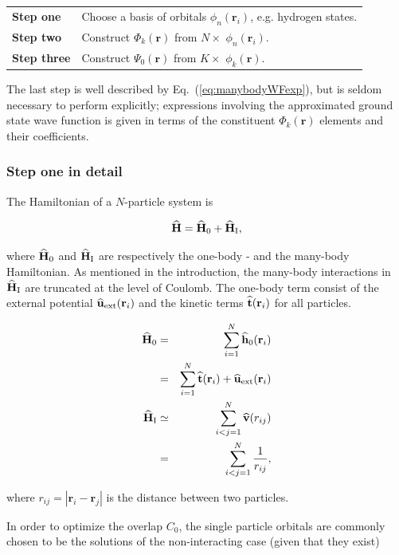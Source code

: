 \begin{center}
\begin{tabular}{l|l}
 \textbf{Step one}   &  Choose a basis of orbitals $\phi_n(\mathbf{r}_i)$, e.g. hydrogen states. \\
 \textbf{Step two}   &  Construct $\Phi_k(\mathbf{r})$ from $N\times$ $\phi_n(\mathbf{r}_i)$.   \\
 \textbf{Step three} &  Construct $\Psi_0(\mathbf{r})$ from $K\times$ $\phi_k(\mathbf{r})$.     \\
\end{tabular}
\end{center}

The last step is well described by Eq.~(\ref{eq:manybodyWFexp}), but is seldom necessary to perform explicitly; expressions involving the approximated ground state wave function is given in terms of the constituent $\Phi_k(\mathbf{r})$ elements and their coefficients.

\subsubsection{Step one in detail}

The Hamiltonian of a $N$-particle system is 

\begin{equation}
 {\bf\widehat{H}} = {\bf\widehat{H}}_0 + {\bf\widehat{H}}_\mathrm{I},
\end{equation}

where ${\bf\widehat{H}}_0$ and ${\bf\widehat{H}}_\mathrm{I}$ are respectively the one-body - and the many-body Hamiltonian. As mentioned in the introduction, the many-body interactions in ${\bf\widehat{H}}_\mathrm{I}$ are truncated at the level of Coulomb. The one-body term consist of the external potential ${\bf\widehat{u}}_\mathrm{ext}(\mathbf{r}_i)$ and the kinetic terms ${\bf\widehat{t}}(\mathbf{r}_i)$ for all particles.

\begin{eqnarray}
 {\bf\widehat{H}}_0 &=& \sum_{i=1}^N {\bf\widehat{h}}_0(\mathbf{r}_i) \\
          &=& \sum_{i=1}^N {\bf\widehat{t}}(\mathbf{r}_i) + {\bf\widehat{u}}_\mathrm{ext}(\mathbf{r}_i) \nonumber\\
 {\bf\widehat{H}}_\mathrm{I} &\simeq& \sum_{i<j=1}^N {\bf\widehat{v}}(r_{ij}) \\
          &=& \sum_{i<j=1}^N \frac{1}{r_{ij}},  \nonumber
\end{eqnarray}

where $r_{ij} = |\mathbf{r}_i - \mathbf{r}_j|$ is the distance between two particles.

In order to optimize the overlap $C_0$, the single particle orbitals are commonly chosen to be the solutions of the non-interacting case (given that they exist)


